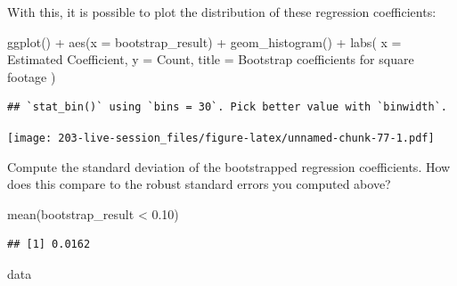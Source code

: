 \documentclass[
]{book}
\newenvironment{Shaded}{\begin{snugshade}}{\end{snugshade}}
\newcommand{\AttributeTok}[1]{\textcolor[rgb]{0.77,0.63,0.00}{#1}}
\newcommand{\FloatTok}[1]{\textcolor[rgb]{0.00,0.00,0.81}{#1}}
\newcommand{\FunctionTok}[1]{\textcolor[rgb]{0.00,0.00,0.00}{#1}}
\newcommand{\NormalTok}[1]{#1}
\newcommand{\SpecialCharTok}[1]{\textcolor[rgb]{0.00,0.00,0.00}{#1}}
\newcommand{\StringTok}[1]{\textcolor[rgb]{0.31,0.60,0.02}{#1}}
\theoremstyle{definition}
\theoremstyle{definition}
\theoremstyle{definition}
\theoremstyle{definition}
\theoremstyle{remark}
\begin{document}
With this, it is possible to plot the distribution of these regression coefficients:

\begin{Shaded}
\begin{Highlighting}[]
\FunctionTok{ggplot}\NormalTok{() }\SpecialCharTok{+} 
  \FunctionTok{aes}\NormalTok{(}\AttributeTok{x =}\NormalTok{ bootstrap\_result) }\SpecialCharTok{+} 
  \FunctionTok{geom\_histogram}\NormalTok{() }\SpecialCharTok{+} 
  \FunctionTok{labs}\NormalTok{(}
    \AttributeTok{x =} \StringTok{\textquotesingle{}Estimated Coefficient\textquotesingle{}}\NormalTok{, }
    \AttributeTok{y =} \StringTok{\textquotesingle{}Count\textquotesingle{}}\NormalTok{, }
    \AttributeTok{title =} \StringTok{\textquotesingle{}Bootstrap coefficients for square footage\textquotesingle{}}
\NormalTok{  )}
\end{Highlighting}
\end{Shaded}

\begin{verbatim}
## `stat_bin()` using `bins = 30`. Pick better value with `binwidth`.
\end{verbatim}

\texttt{[image: 203-live-session\_files/figure-latex/unnamed-chunk-77-1.pdf]}

Compute the standard deviation of the bootstrapped regression coefficients. How does this compare to the robust standard errors you computed above?

\begin{Shaded}
\begin{Highlighting}[]
\FunctionTok{mean}\NormalTok{(bootstrap\_result }\SpecialCharTok{\textless{}} \FloatTok{0.10}\NormalTok{)}
\end{Highlighting}
\end{Shaded}

\begin{verbatim}
## [1] 0.0162
\end{verbatim}

\begin{Shaded}
\begin{Highlighting}[]
\NormalTok{data}
\end{Highlighting}
\end{Shaded}
\end{document}
